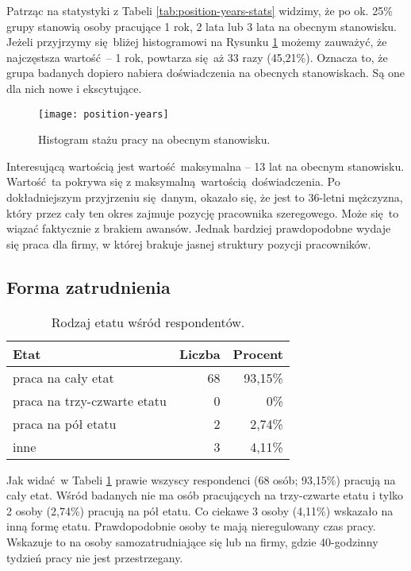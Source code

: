 Patrząc na statystyki z Tabeli \ref{tab:position-years-stats} widzimy, że po ok. 25\% grupy stanowią osoby pracujące 1 rok, 2 lata lub 3 lata na obecnym stanowisku. Jeżeli przyjrzymy się bliżej histogramowi na Rysunku \ref{fig:position-years} możemy zauważyć, że najczęstsza wartość -- 1 rok, powtarza się aż 33 razy (45,21\%). Oznacza to, że grupa badanych dopiero nabiera doświadczenia na obecnych stanowiskach. Są one dla nich nowe i ekscytujące.

\begin{figure}[h]
\begin{center}
\texttt{[image: position-years]}
\end{center}
\caption{Histogram stażu pracy na obecnym stanowisku.}
\label{fig:position-years}
\end{figure}

Interesującą wartością jest wartość maksymalna -- 13 lat na obecnym stanowisku. Wartość ta pokrywa się z maksymalną wartością doświadczenia. Po dokładniejszym przyjrzeniu się danym, okazało się, że jest to 36-letni mężczyzna, który przez cały ten okres zajmuje pozycję pracownika szeregowego. Może się to wiązać faktycznie z brakiem awansów. Jednak bardziej prawdopodobne wydaje się praca dla firmy, w której brakuje jasnej struktury pozycji pracowników.

\subsection{Forma zatrudnienia}

\begin{table}[h!]
\begin{center}
\begin{tabular}{l r r}
Etat & Liczba & Procent \\ \hline
praca na cały etat & 68 & 93,15\% \\
praca na trzy-czwarte etatu & 0 & 0\% \\
praca na pół etatu & 2 & 2,74\% \\
inne & 3 & 4,11\% \\
\end{tabular}
\end{center}
\caption{Rodzaj etatu wśród respondentów.}
\label{tab:work-time-stats}
\end{table}

Jak widać w Tabeli \ref{tab:work-time-stats} prawie wszyscy respondenci (68 osób; 93,15\%) pracują na cały etat. Wśród badanych nie ma osób pracujących na trzy-czwarte etatu i tylko 2 osoby (2,74\%) pracują na pół etatu. Co ciekawe 3 osoby (4,11\%) wskazało na inną formę etatu. Prawdopodobnie osoby te mają nieregulowany czas pracy. Wskazuje to na osoby samozatrudniające się lub na firmy, gdzie 40-godzinny tydzień pracy nie jest przestrzegany.

